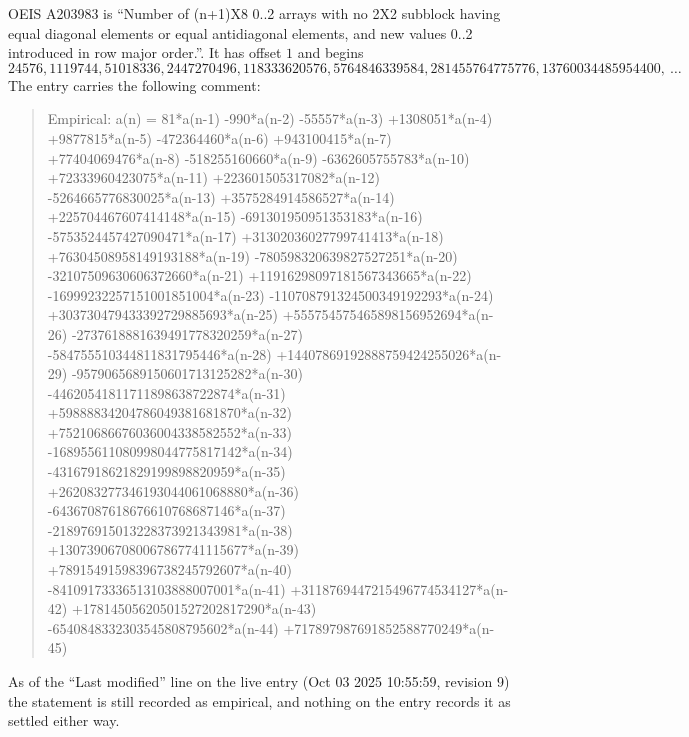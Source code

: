\documentclass[11pt,a4paper]{article}
\theoremstyle{plain}
\theoremstyle{definition}
\begin{document}
OEIS A203983 is ``Number of (n+1)X8 0..2 arrays with no 2X2 subblock having equal diagonal elements or equal antidiagonal elements, and new values 0..2 introduced in row major order.''. It has offset $1$ and begins
\[
24576, 1119744, 51018336, 2447270496, 118333620576, 5764846339584, 281455764775776, 13760034485954400,\ \dots
\]
The entry carries the following comment:
\begin{quote}\small
Empirical: a(n) = 81*a(n-1) -990*a(n-2) -55557*a(n-3) +1308051*a(n-4) +9877815*a(n-5) -472364460*a(n-6) +943100415*a(n-7) +77404069476*a(n-8) -518255160660*a(n-9) -6362605755783*a(n-10) +72333960423075*a(n-11) +223601505317082*a(n-12) -5264665776830025*a(n-13) +3575284914586527*a(n-14) +225704467607414148*a(n-15) -691301950951353183*a(n-16) -5753524457427090471*a(n-17) +31302036027799741413*a(n-18) +76304508958149193188*a(n-19) -780598320639827527251*a(n-20) -32107509630606372660*a(n-21) +11916298097181567343665*a(n-22) -16999232257151001851004*a(n-23) -110708791324500349192293*a(n-24) +303730479433392729885693*a(n-25) +555754575465898156952694*a(n-26) -2737618881639491778320259*a(n-27) -584755510344811831795446*a(n-28) +14407869192888759424255026*a(n-29) -9579065689150601713125282*a(n-30) -44620541811711898638722874*a(n-31) +59888834204786049381681870*a(n-32) +75210686676036004338582552*a(n-33) -168955611080998044775817142*a(n-34) -43167918621829199898820959*a(n-35) +262083277346193044061068880*a(n-36) -64367087618676610768687146*a(n-37) -218976915013228373921343981*a(n-38) +130739067080067867741115677*a(n-39) +78915491598396738245792607*a(n-40) -84109173336513103888007001*a(n-41) +3118769447215496774534127*a(n-42) +17814505620501527202817290*a(n-43) -6540848332303545808795602*a(n-44) +717897987691852588770249*a(n-45)
\end{quote}
As of the ``Last modified'' line on the live entry (Oct 03 2025 10:55:59, revision 9) the statement is
still recorded as empirical, and nothing on the entry records it as settled either way.
\end{document}
